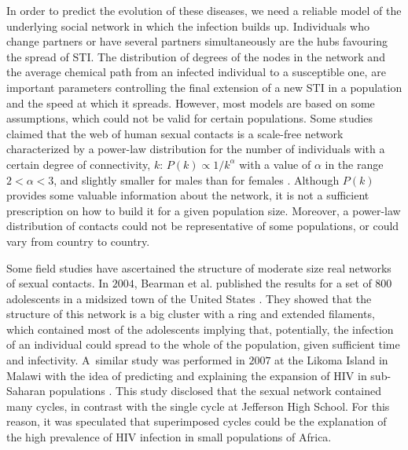 In order to predict the evolution of these diseases, we need a reliable model of the underlying social network in which the 
infection builds up. Individuals who change partners or have several partners simultaneously are the hubs favouring the spread
of STI. The distribution of degrees of the nodes in the network and the average chemical path from an infected individual to 
a susceptible one, are important parameters controlling the final extension of a new STI in a population and the speed at which it spreads. However, most models are based on some assumptions, which could not be valid for certain populations. Some studies claimed that the web of human sexual contacts is a scale-free network characterized by a power-law distribution for the number of individuals with a certain degree of connectivity, $k$: $P(k)\propto 1/k^\alpha$ with a value of $\alpha$ in the range $2 <\alpha < 3$, and slightly smaller for males than for females \cite{Web}. Although $P(k)$ provides some valuable information about the network, it is not a sufficient prescription on how to build it for a given population size. Moreover, a power-law distribution of contacts could not be representative of some populations, or could vary from country to country. 

Some field studies have ascertained the structure of moderate size real networks of sexual contacts. In $2004$, Bearman et al. 
published the results for a set of $800$ adolescents in a midsized town of the United States \cite{Bearman}. They showed that the structure of this network is a big cluster with a ring and extended filaments, which contained most of the adolescents implying that, potentially, the infection of an individual could spread to the whole of the population, given sufficient time and infectivity. A~similar study was performed in $2007$ at the Likoma Island in Malawi with the idea of predicting and explaining the expansion of HIV in sub-Saharan populations \cite{Likoma}. This study disclosed  that the sexual network contained many cycles, in contrast with the single cycle at Jefferson High School. For this reason, it was speculated that superimposed cycles could be the explanation of the high prevalence of HIV infection in small populations of Africa.

